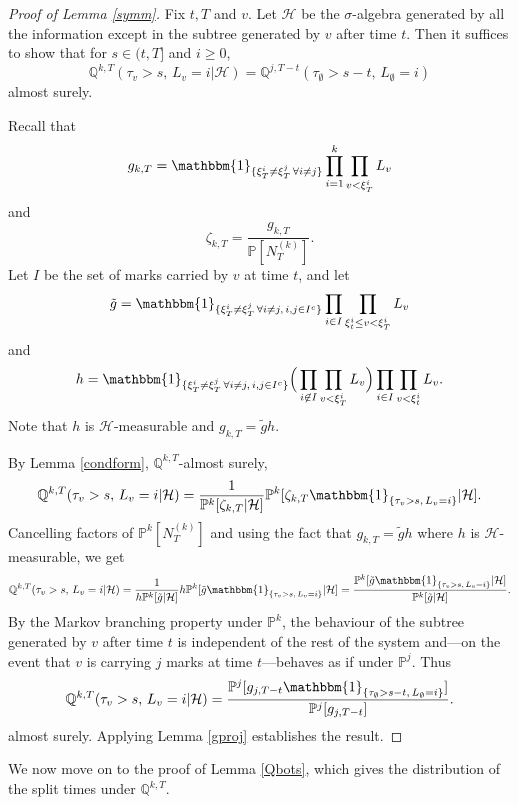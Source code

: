 \documentclass{article}
\theoremstyle{plain}
\theoremstyle{definition}
\newcommand{\Q}{\mathbb{Q}}
\renewcommand{\P}{\mathbb{P}}
\renewcommand{\H}{\mathcal{H}}
\newcommand{\ind}{\mathbbm{1}}
\begin{document}
\begin{proof}[Proof of Lemma \ref{symm}]
Fix $t,T$ and $v$. Let $\H$ be the $\sigma$-algebra generated by all the information except in the subtree generated by $v$ after time $t$. Then it suffices to show that for $s\in(t,T]$ and $i\ge 0$,
\[\Q^{k,T}(\tau_v > s,\, L_v = i | \H) = \Q^{j,T-t}(\tau_\emptyset > s-t, \, L_\emptyset = i)\]
almost surely.

Recall that
\[g_{k,T} = \ind_{\{\xi^i_T \neq \xi^j_T \,\forall i\neq j\}} \prod_{i=1}^k \prod_{v<\xi^i_T} L_v\]
and
\[\zeta_{k,T} = \frac{g_{k,T}}{\P[N^{(k)}_T]}.\]
Let $I$ be the set of marks carried by $v$ at time $t$, and let
\[\tilde g = \ind_{\{\xi^i_T \neq \xi^j_T \, \forall i\neq j,\, i,j\in I^c\}} \prod_{i\in I}\prod_{\xi^i_t\le v<\xi^i_T} L_v\]
and
\[h = \ind_{\{\xi^i_T \neq \xi^j_T \, \forall i\neq j,\, i,j\in I^c\}} \Big(\prod_{i\not\in I}\prod_{v<\xi^i_T} L_v\Big) \prod_{i\in I}\prod_{v< \xi^i_t} L_v.\]
Note that $h$ is $\H$-measurable and $g_{k,T}=\tilde g h$.

By Lemma \ref{condform}, $\Q^{k,T}$-almost surely,
\[\Q^{k,T}(\tau_v > s, \, L_v = i | \H) = \frac{1}{\P^k[\zeta_{k,T}|\H]} \P^k[\zeta_{k,T}\ind_{\{\tau_v > s, \, L_v = i\}} | \H].\]
Cancelling factors of $\P^k[N^{(k)}_T]$ and using the fact that $g_{k,T}=\tilde g h$ where $h$ is $\H$-measurable, we get
\[\Q^{k,T}(\tau_v > s, \, L_v = i | \H) = \frac{1}{h\P^k[\tilde g|\H]} h\P^k[\tilde g \ind_{\{\tau_v > s, \, L_v = i\}} | \H] = \frac{\P^k[\tilde g \ind_{\{\tau_v > s, \, L_v = i\}} | \H]}{\P^k[\tilde g|\H]}.\]
By the Markov branching property under $\P^k$, the behaviour of the subtree generated by $v$ after time $t$ is independent of the rest of the system and---on the event that $v$ is carrying $j$ marks at time $t$---behaves as if under $\P^j$. Thus
\[\Q^{k,T}(\tau_v > s, \, L_v = i | \H) = \frac{\P^j[g_{j,T-t} \ind_{\{\tau_\emptyset > s - t,\, L_\emptyset = i\}}]}{\P^j[g_{j,T-t}]}.\]
almost surely. Applying Lemma \ref{gproj} establishes the result.
\end{proof}

We now move on to the proof of Lemma \ref{Qbots}, which gives the distribution of the split times under $\Q^{k,T}$.
\end{document}
